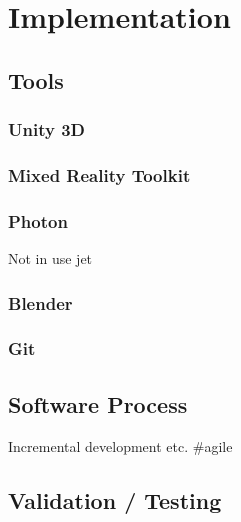 


\chapter{Implementation}

\section{Tools}


\subsection*{Unity 3D}

\subsection*{Mixed Reality Toolkit}

\subsection*{Photon}
Not in use jet

\subsection*{Blender}

\subsection*{Git}



\section{Software Process}
Incremental development etc. \#agile
\section{Validation / Testing}


